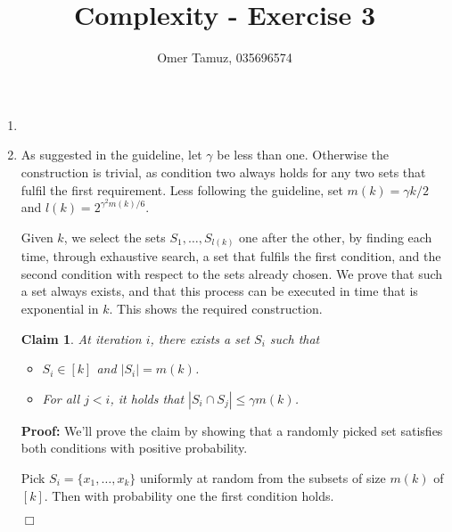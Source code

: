 \documentclass[11pt]{article} \usepackage{amssymb}
\newtheorem{claim}[theorem]{Claim}
\newenvironment{proof}{\noindent \textbf{Proof:}}{$\Box$}
\begin{document}
\title{Complexity - Exercise 3}

 \author{Omer Tamuz, 035696574}
\maketitle


\begin{enumerate}
\item
\item

As suggested in the guideline, let $\gamma$ be less than one. Otherwise the
construction is trivial, as condition two always holds for any two sets that
fulfil the first requirement. Less following the guideline, set 
$m(k)=\gamma k/2$ and $l(k)=2^{\gamma^2 m(k)/6}$. 

Given $k$, we select the sets $S_1,\ldots,S_{l(k)}$ one
after the other, by finding each time, through exhaustive search, a set
that fulfils the first condition, and the second condition with respect to the 
sets already chosen. We prove that such a set always exists, and that
this process can be executed in time that is exponential in $k$. This shows
the required construction.

\begin{claim}
At iteration $i$, there exists a set $S_i$ such that
\begin{itemize}
\item $S_i\in [k]$ and $|S_i|=m(k)$.
\item For all $j<i$, it holds that $|S_i\cap S_j|\leq \gamma m(k)$.
\end{itemize}
\end{claim}
\begin{proof}
  We'll prove the claim by showing that a randomly picked set satisfies both
conditions with positive probability.

  Pick $S_i=\{x_1,\ldots,x_k\}$ uniformly at random from the subsets of size 
$m(k)$ of $[k]$.
Then with probability one the first condition holds. 


\end{proof}
\end{enumerate}
\end{document}
